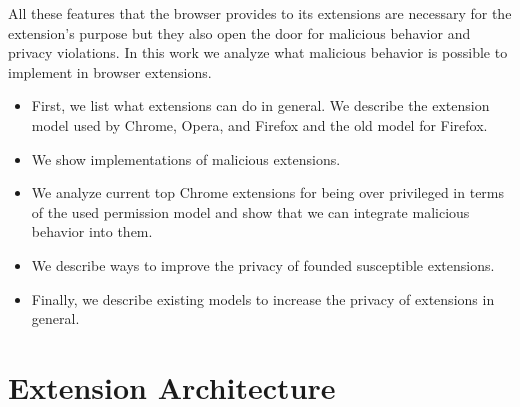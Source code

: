 \documentclass[article,colorback,accentcolor=tud9c,type=bsc]{tudthesis}
\let\stdsection\section
\renewcommand\section{\newpage\stdsection}
\begin{document}
	All these features that the browser provides to its extensions are necessary for the extension's purpose but they also open the door for malicious behavior and privacy violations. In this work we analyze what malicious behavior is possible to implement in browser extensions. 
	\begin{itemize}
		\itemsep-5px
		\item First, we list what extensions can do in general. We describe the extension model used by Chrome, Opera, and Firefox and the old model for Firefox.
		\item We show implementations of malicious extensions. 
		\item We analyze current top Chrome extensions for being over privileged in terms of the used permission model and show that we can integrate malicious behavior into them.
		\item We describe ways to improve the privacy of founded susceptible extensions. 
		\item Finally, we describe existing models to increase the privacy of extensions in general. 
	\end{itemize}
	
	
\section{Extension Architecture}
	
\end{document}
